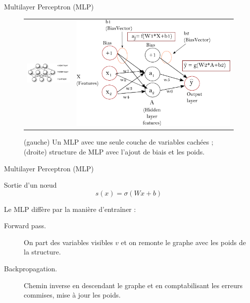 \begin{frame}{Multilayer Perceptron (MLP)}
\begin{figure}[ht!]
\centering
\begin{tabular}{cc}
\includegraphics[width = .5\columnwidth]{../fig/mlp} &
\includegraphics[width = .5\columnwidth]{../fig/backprop_notation.png} 
\end{tabular}
\caption{(gauche) Un MLP avec une seule couche de variables cachées ; (droite) structure de MLP avec l'ajout de biais et les poids.}
\label{fig2}
\end{figure}
\end{frame}



\begin{frame}{Multilayer Perceptron (MLP)}
\begin{block}{Sortie d'un nœud}
\begin{equation}
s(x) = \sigma(Wx + b)
\end{equation}
\end{block}
Le MLP diffère par la manière d'entraîner :
\begin{description}
\item[Forward pass. ]On part des variables visibles $v$ et on remonte le graphe avec les poids de la structure.
\item[Backpropagation. ]Chemin inverse en descendant le graphe et en comptabilisant les erreurs commises, mise à jour les poids.
\end{description}
\end{frame}

